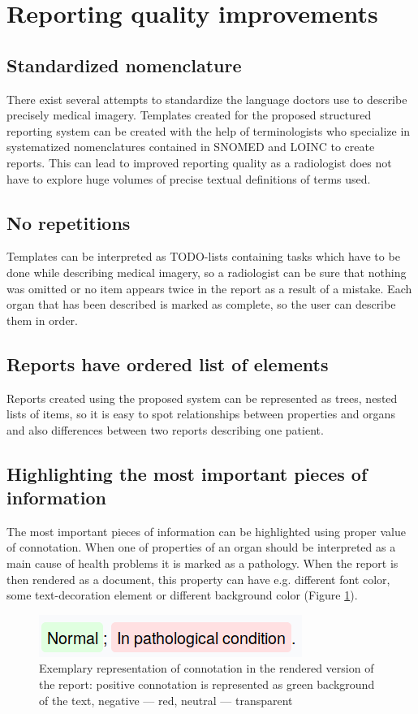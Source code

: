 \documentclass[12pt, twoside, openany]{report}
\theoremstyle{definition}
\begin{document}
\section{Reporting quality improvements}
\subsection{Standardized nomenclature}
There exist several attempts to standardize the language doctors use to describe precisely medical imagery. Templates created for the proposed structured reporting system can be created with the help of terminologists who specialize in systematized nomenclatures contained in SNOMED and LOINC to create reports. This can lead to improved reporting quality as a radiologist does not have to explore huge volumes of precise textual definitions of terms used. 
\subsection{No repetitions}
Templates can be interpreted as TODO-lists containing tasks which have to be done while describing medical imagery, so a radiologist can be sure that nothing was omitted or no item appears twice in the report as a result of a mistake. Each organ that has been described is marked as complete, so the user can describe them in order.
\subsection{Reports have ordered list of elements}
Reports created using the proposed system can be represented as trees, nested lists of items, so it is easy to spot relationships between properties and organs and also differences between two reports describing one patient.
\subsection{Highlighting the most important pieces of information}
The most important pieces of information can be highlighted using proper value of connotation. When one of properties of an organ should be interpreted as a main cause of health problems it is marked as a pathology. When the report is then rendered as a document, this property can have e.g. different font color, some text-decoration element or different background color (Figure \ref{property-connotation-rendered}).

\begin{figure}
	\centering
	\includegraphics[width=0.3\linewidth]{property-connotation-rendered}
	\caption{Exemplary representation of connotation in the rendered version of the report: positive connotation is represented as green background of the text, negative --- red, neutral --- transparent
		\label{property-connotation-rendered}
	}
\end{figure}
\end{document}
